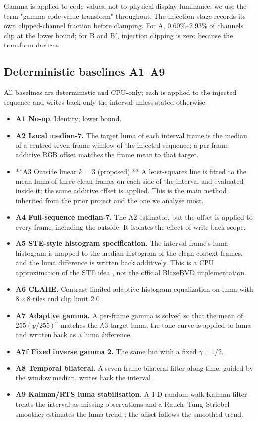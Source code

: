 \documentclass[twocolumn,10pt]{svjour3}
\begin{document}
Gamma is applied to code values, not to physical display luminance; we use the term "gamma code-value transform" throughout. The injection stage records its own clipped-channel fraction before clamping. For A, 0.60\%–2.93\% of channels clip at the lower bound; for B and B$'$, injection clipping is zero because the transform darkens.


\subsection{Deterministic baselines A1–A9}

All baselines are deterministic and CPU-only; each is applied to the injected sequence and writes back only the interval unless stated otherwise.


\begin{itemize}
\item \textbf{A1 No-op.} Identity; lower bound.
\item \textbf{A2 Local median-7.} The target luma of each interval frame is the median of a centred seven-frame window of the injected sequence; a per-frame additive RGB offset matches the frame mean to that target.
\item **A3 Outside linear $k{=}3$ (proposed).** A least-squares line is fitted to the mean luma of three clean frames on each side of the interval and evaluated inside it; the same additive offset is applied. This is the main method inherited from the prior project and the one we analyse most.
\item \textbf{A4 Full-sequence median-7.} The A2 estimator, but the offset is applied to every frame, including the outside. It isolates the effect of write-back scope.
\item \textbf{A5 STE-style histogram specification.} The interval frame's luma histogram is mapped to the median histogram of the clean context frames, and the luma difference is written back additively. This is a CPU approximation of the STE idea \cite{delon2006movie}, not the official BlazeBVD implementation.
\item \textbf{A6 CLAHE.} Contrast-limited adaptive histogram equalization on luma with $8\times8$ tiles and clip limit 2.0 .
\item \textbf{A7 Adaptive gamma.} A per-frame gamma is solved so that the mean of $255(y/255)^\gamma$ matches the A3 target luma; the tone curve is applied to luma and written back as a luma difference.
\item \textbf{A7f Fixed inverse gamma 2.} The same but with a fixed $\gamma=1/2$.
\item \textbf{A8 Temporal bilateral.} A seven-frame bilateral filter along time, guided by the window median, writes back the interval \cite{tomasi1998bilateral}.
\item \textbf{A9 Kalman/RTS luma stabilisation.} A 1-D random-walk Kalman filter treats the interval as missing observations and a Rauch–Tung–Striebel smoother estimates the luma trend \cite{kalman1960new}; the offset follows the smoothed trend.
\end{itemize}
\end{document}
